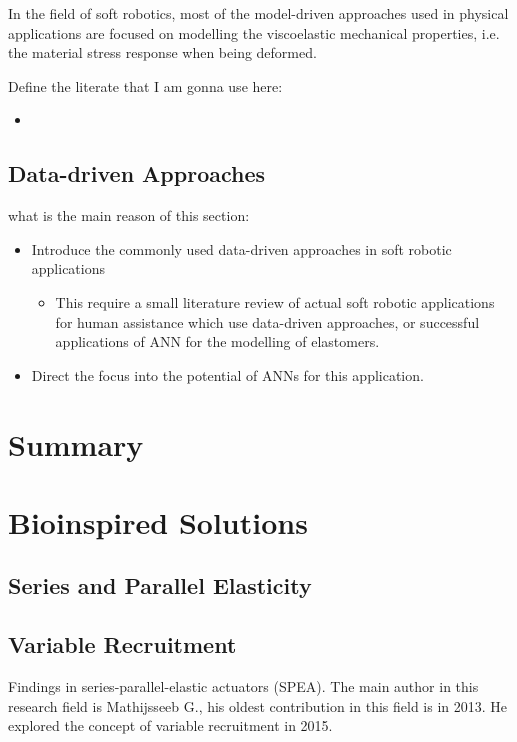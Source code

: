 In the field of soft robotics, most of the model-driven approaches used in physical applications are focused on modelling the viscoelastic mechanical properties, i.e. the material stress response when being deformed. 

Define the literate that I am gonna use here:

\begin{itemize}
    \item 
\end{itemize}

\subsection{Data-driven Approaches}

what is the main reason of this section:
\begin{itemize}
    \item Introduce the commonly used data-driven approaches in soft robotic applications
    \begin{itemize}
        \item This require a small literature review of actual soft robotic applications for human assistance which use data-driven approaches, or successful applications of ANN for the modelling of elastomers.
    \end{itemize}
    \item Direct the focus into the potential of ANNs for this application.
\end{itemize}

\section{Summary}

\section{Bioinspired Solutions}
\subsection{Series and Parallel Elasticity}
\subsection{Variable Recruitment}

Findings in series-parallel-elastic actuators (SPEA). The main author in this research field is  Mathijsseeb G., his oldest contribution in this field is in 2013. He explored the concept of variable recruitment in 2015.

